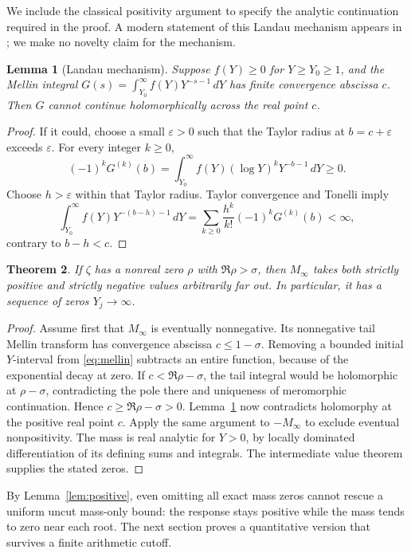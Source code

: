 \documentclass[11pt,a4paper]{article}
\newtheorem{theorem}{Theorem}[section]
\newtheorem{lemma}[theorem]{Lemma}
\theoremstyle{definition}
\theoremstyle{remark}
\newcommand{\dd}{\,d}
\begin{document}
We include the classical positivity argument to specify the analytic
continuation required in the proof. A modern statement of this
Landau mechanism appears in \cite[Theorem 3.1]{MM}; we make no
novelty claim for the mechanism.
\begin{lemma}[Landau mechanism]\label{lem:landau}
Suppose \(f(Y)\ge0\) for \(Y\ge Y_0\ge1\), and the Mellin integral
\(G(s)=\int_{Y_0}^\infty f(Y)Y^{-s-1}\dd Y\) has finite convergence
abscissa \(c\). Then \(G\) cannot continue holomorphically across
the real point \(c\).
\end{lemma}
\begin{proof}
If it could, choose a small \(\varepsilon>0\) such that the Taylor
radius at \(b=c+\varepsilon\) exceeds \(\varepsilon\).
For every integer \(k\ge0\),
\[
 (-1)^kG^{(k)}(b)
 =\int_{Y_0}^\infty f(Y)(\log Y)^kY^{-b-1}\dd Y\ge0.
\]
Choose \(h>\varepsilon\) within that Taylor radius. Taylor convergence
and Tonelli imply
\[
 \int_{Y_0}^\infty f(Y)Y^{-(b-h)-1}\dd Y
 =\sum_{k\ge0}\frac{h^k}{k!}(-1)^kG^{(k)}(b)<\infty,
\]
contrary to \(b-h<c\).
\end{proof}

\begin{theorem}\label{thm:oscillation}
If \(\zeta\) has a nonreal zero \(\rho\) with \(\Re\rho>\sigma\),
then \(M_\infty\) takes both strictly positive and strictly negative
values arbitrarily far out. In particular, it has a sequence of
zeros \(Y_j\to\infty\).
\end{theorem}
\begin{proof}
Assume first that \(M_\infty\) is eventually nonnegative.
Its nonnegative tail Mellin transform has convergence abscissa
\(c\le1-\sigma\). Removing a bounded initial \(Y\)-interval from
\eqref{eq:mellin} subtracts an entire function, because of the
exponential decay at zero. If \(c<\Re\rho-\sigma\), the tail
integral would be holomorphic at \(\rho-\sigma\), contradicting
the pole there and uniqueness of meromorphic continuation.
Hence \(c\ge\Re\rho-\sigma>0\).
Lemma~\ref{lem:landau} now contradicts holomorphy at the positive
real point \(c\). Apply the same argument to \(-M_\infty\) to
exclude eventual nonpositivity.
The mass is real analytic for \(Y>0\), by locally dominated
differentiation of its defining sums and integrals. The intermediate
value theorem supplies the stated zeros.
\end{proof}

By Lemma~\ref{lem:positive}, even omitting all exact mass zeros cannot
rescue a uniform uncut mass-only bound: the response stays positive
while the mass tends to zero near each root.
The next section proves a quantitative version that survives a
finite arithmetic cutoff.
\end{document}

